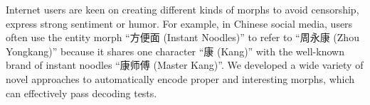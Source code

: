 Internet users are keen on creating different kinds of morphs to avoid censorship, express strong sentiment or humor. For example, in Chinese social media, users often use the entity morph ``方便面 (Instant Noodles)'' to refer to ``周永康 (Zhou Yongkang)'' because it shares one character ``康 (Kang)'' with the well-known brand of instant noodles ``康师傅 (Master Kang)''. We developed a wide variety of novel approaches to automatically encode proper and interesting morphs, which can effectively pass decoding tests.
